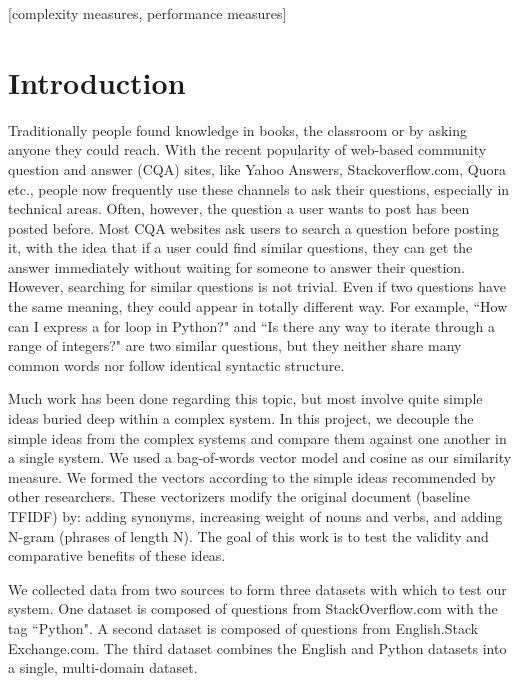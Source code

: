 \documentclass{acm_proc_article-sp}
\begin{document}
[complexity measures, performance measures]



\section{Introduction}
Traditionally people found knowledge in books, the classroom or by asking anyone they could reach. With the recent popularity of web-based community question and answer (CQA) sites, like Yahoo Answers, Stackoverflow.com, Quora etc., people now frequently use these channels to ask their questions, especially in technical areas. Often, however, the question a user wants to post has been posted before. Most CQA websites ask users to search a question before posting it, with the idea that if a user could find similar questions, they can get the answer immediately without waiting for someone to answer their question. However, searching for similar questions is not trivial. Even if two questions have the same meaning, they could appear in totally different way.  For example, ``How can I express a for loop in Python?" and ``Is there any way to iterate through a range of integers?" are two similar questions, but they neither share many common words nor follow identical syntactic structure. 

Much work has been done regarding this topic, but most involve quite simple ideas buried deep within a complex system. In this project, we decouple the simple ideas from the complex systems and compare them against one another in a single system. We used a bag-of-words vector model and cosine as our similarity measure. We formed the vectors according to the simple ideas recommended by other researchers. These vectorizers modify the original document (baseline TFIDF) by: adding synonyms, increasing weight of nouns and verbs, and adding N-gram (phrases of length N). The goal of this work is to test the validity and comparative benefits of these ideas.

We collected data from two sources to form three datasets with which to test our system. One dataset is composed of questions from StackOverflow.com with the tag ``Python". A second dataset is composed of questions from English.Stack
Exchange.com. 
The third dataset combines the English and Python datasets into a single, multi-domain dataset.
\end{document}
